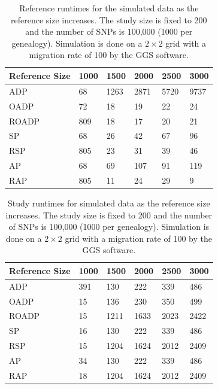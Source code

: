 \documentclass{article}
\begin{document}
\begin{table}
  \centering
  \begin{tabular}{|l|l|l|l|l|l|}
    \hline
    Reference Size & 1000 & 1500 & 2000 & 2500 & 3000 \\
    \hline
    ADP        &  68  & 1263 & 2871 & 5720 & 9737 \\
    OADP       &  72  & 18   & 19   & 22   & 24   \\
    ROADP      & 809  & 18   & 17   & 20   & 21   \\
    SP         &  68  & 26   & 42   & 67   & 96   \\
    RSP        & 805  & 23   & 31   & 39   & 46   \\
    AP         &  68  & 69   & 107  & 91   & 119  \\
    RAP        & 805  & 11   & 24   & 29   & 9    \\
    \hline
  \end{tabular}
  \caption{
    Reference runtimes for the simulated data as the reference size increases.
    The study size is fixed to 200 and the number of SNPs is 100,000 (1000 per genealogy). 
    Simulation is done on a $2 \times 2$ grid with a migration rate of 100 by the GGS software. 
  }
  \label{tbl:nChg-runtimes-ref}
\end{table}

\begin{table}
  \centering
  \begin{tabular}{|l|l|l|l|l|l|}
    \hline
    Reference Size & 1000 & 1500 & 2000 & 2500 & 3000 \\
    \hline
    ADP        & 391  &  130 &  222 &  339 &  486 \\
    OADP       & 15   &  136 &  230 &  350 &  499 \\
    ROADP      & 15   & 1211 & 1633 & 2023 & 2422 \\
    SP         & 16   &  130 &  222 &  339 &  486 \\
    RSP        & 15   & 1204 & 1624 & 2012 & 2409 \\
    AP         & 34   &  130 &  222 &  339 &  486 \\
    RAP        & 18   & 1204 & 1624 & 2012 & 2409 \\
    \hline
  \end{tabular}
  \caption{
    Study runtimes for simulated data as the reference size increases.
    The study size is fixed to 200 and the number of SNPs is 100,000 (1000 per genealogy). 
    Simulation is done on a $2 \times 2$ grid with a migration rate of 100 by the GGS software. 
  }
  \label{tbl:nChg-runtimes-study}
\end{table}
\end{document}

